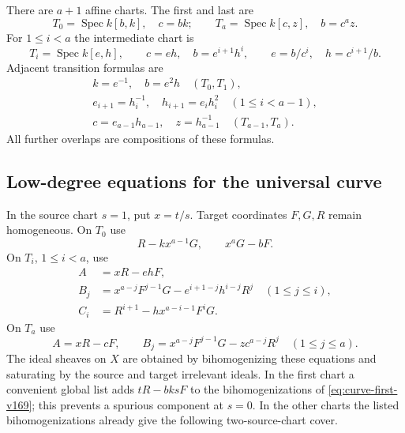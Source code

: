 \documentclass[11pt,reqno]{amsart}
\numberwithin{equation}{section}
\theoremstyle{definition}\newtheorem{definition}[theorem]{Definition}
\theoremstyle{remark}\newtheorem{remark}[theorem]{Remark}
\DeclareMathOperator{\Spec}{Spec}\DeclareMathOperator{\PGL}{PGL}
\begin{document}
There are $a+1$ affine charts. The first and last are
\[
 T_0=\Spec k[b,k],\quad c=bk;
 \qquad T_a=\Spec k[c,z],\quad b=c^az.
\]
For $1\leq i<a$ the intermediate chart is
\begin{equation}\label{eq:chain-charts-v169}
 T_i=\Spec k[e,h],\qquad c=eh,\quad b=e^{i+1}h^i,
 \qquad e=b/c^i,\quad h=c^{i+1}/b.
\end{equation}
Adjacent transition formulas are
\begin{equation}\label{eq:chain-transitions-v169}
 \begin{gathered}
 k=e^{-1},\quad b=e^2h \quad(T_0,T_1),\\
 e_{i+1}=h_i^{-1},\quad h_{i+1}=e_i h_i^2
                  \quad(1\leq i<a-1),\\
 c=e_{a-1}h_{a-1},\quad z=h_{a-1}^{-1}
                  \quad(T_{a-1},T_a).
 \end{gathered}
\end{equation}
All further overlaps are compositions of these formulas.

\subsection{Low-degree equations for the universal curve}
In the source chart $s=1$, put $x=t/s$. Target coordinates $F,G,R$
remain homogeneous. On $T_0$ use
\begin{equation}\label{eq:curve-first-v169}
 R-kx^{a-1}G,\qquad x^aG-bF.
\end{equation}
On $T_i$, $1\leq i<a$, use
\begin{equation}\label{eq:curve-middle-v169}
 \begin{split}
 A&=xR-ehF,\\
 B_j&=x^{a-j}F^{j-1}G-e^{i+1-j}h^{i-j}R^j\quad(1\leq j\leq i),\\
 C_i&=R^{i+1}-h x^{a-i-1}F^iG.
 \end{split}
\end{equation}
On $T_a$ use
\begin{equation}\label{eq:curve-last-v169}
 A=xR-cF,\qquad
 B_j=x^{a-j}F^{j-1}G-zc^{a-j}R^j\quad(1\leq j\leq a).
\end{equation}
The ideal sheaves on $X$ are obtained by bihomogenizing these equations
and saturating by the source and target irrelevant ideals. In the
first chart a convenient global list adds $tR-bksF$ to the
bihomogenizations of \eqref{eq:curve-first-v169}; this prevents a
spurious component at $s=0$. In the other charts the listed
bihomogenizations already give the following two-source-chart cover.
\end{document}
